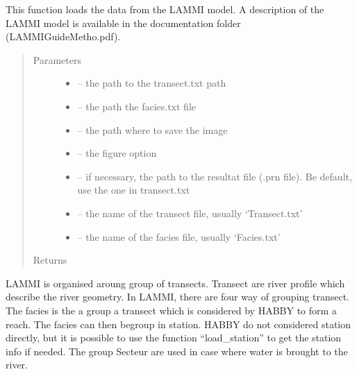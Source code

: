 \documentclass[letterpaper,10pt,english]{sphinxmanual}
\begin{document}
\begin{fulllineitems}
\label{\detokenize{index:src.lammi.load_lammi}}
This function loads the data from the LAMMI model. A description of the LAMMI model is available in the
documentation folder (LAMMIGuideMetho.pdf).
\begin{quote}\begin{description}
\item[{Parameters}] \leavevmode\begin{itemize}
\item {} 
 -- the path to the transect.txt path

\item {} 
 -- the path the facies.txt file

\item {} 
 -- the path where to save the image

\item {} 
 -- the figure option

\item {} 
 -- if necessary, the path to the resultat file (.prn file). Be default, use the one in transect.txt

\item {} 
 -- the name of the transect file, usually `Transect.txt'

\item {} 
 -- the name of the facies file, usually `Facies.txt'

\end{itemize}

\item[{Returns}] \leavevmode


\end{description}\end{quote}


LAMMI is organised aroung group of transects. Transect are river profile which describe the river geometry.
In LAMMI, there are four way of grouping transect. The facies is the a group a transect which is considered by HABBY
to form a reach. The facies can then begroup in station. HABBY do not considered station directly, but it is possible
to use the function ``load\_station'' to get the station info if needed. The group Secteur are used in case where
water is brought to the river.


\end{fulllineitems}
\end{document}
